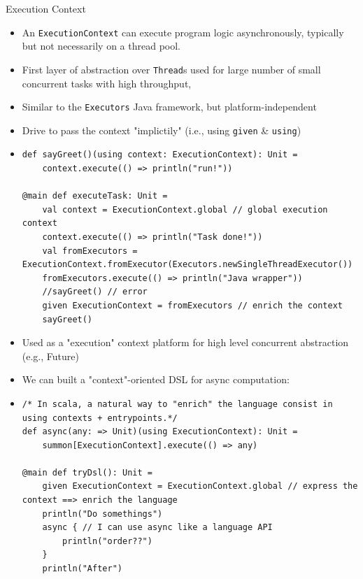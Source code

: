 \documentclass[presentation, 9pt]{beamer}\mode<presentation>{\usetheme{AMSBolognaFC}}
\begin{document}
\begin{frame}{Execution Context}
	\begin{itemize}
		\item An \texttt{ExecutionContext} can execute program logic asynchronously, typically but not necessarily on a thread pool.
		\item First layer of abstraction over \texttt{Thread}s used for large number of small concurrent tasks with high
		throughput,
  	\item Similar to the \texttt{Executors} Java framework, but platform-independent 
   	\item Drive to pass the context "implictily" (i.e., using \texttt{given} \& \texttt{using}) 
		 \item[] \begin{tcolorbox}[left=0pt, top=0pt, bottom=0pt]
			\begin{verbatim}
def sayGreet()(using context: ExecutionContext): Unit =
	context.execute(() => println("run!"))

@main def executeTask: Unit =
	val context = ExecutionContext.global // global execution context
	context.execute(() => println("Task done!"))
	val fromExecutors = ExecutionContext.fromExecutor(Executors.newSingleThreadExecutor())
	fromExecutors.execute(() => println("Java wrapper"))
	//sayGreet() // error
	given ExecutionContext = fromExecutors // enrich the context
	sayGreet()
			\end{verbatim}
		\end{tcolorbox}
	\end{itemize}
	\framebreak
	\begin{itemize}
		\item Used as a "execution" context platform for high level concurrent abstraction (e.g., Future)
  	\item We can built a "context"-oriented DSL for async computation:
		\item[] \begin{tcolorbox}[left=0pt, top=0pt, bottom=0pt]
			\begin{verbatim}
/* In scala, a natural way to "enrich" the language consist in using contexts + entrypoints.*/
def async(any: => Unit)(using ExecutionContext): Unit =
	summon[ExecutionContext].execute(() => any)

@main def tryDsl(): Unit =
	given ExecutionContext = ExecutionContext.global // express the context ==> enrich the language
	println("Do somethings")
	async { // I can use async like a language API
		println("order??")
	}
	println("After")
			\end{verbatim}
		\end{tcolorbox}
	\end{itemize}
\end{frame}
\end{document}
